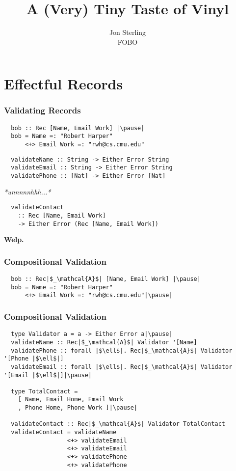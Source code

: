 \documentclass[tikz, 12pt]{beamer}
\title{A (Very) Tiny Taste of Vinyl}
\author{Jon Sterling\\
    FOBO
}
\begin{document}
\begin{frame}
  \titlepage
\end{frame}

\section{Effectful Records}

\begin{frame}[fragile]
  \frametitle{Validating Records}\pause
  \begin{lstlisting}
  bob :: Rec [Name, Email Work] |\pause|
  bob = Name =: "Robert Harper"
      <+> Email Work =: "rwh@cs.cmu.edu"
  \end{lstlisting}
  \pause
  \begin{lstlisting}
  validateName :: String -> Either Error String
  validateEmail :: String -> Either Error String
  validatePhone :: [Nat] -> Either Error [Nat]
  \end{lstlisting}
  \pause
  \centerline{\textit{*unnnnnhhh...*}}
  \pause
  \begin{lstlisting}
  validateContact
    :: Rec [Name, Email Work]
    -> Either Error (Rec [Name, Email Work])
  \end{lstlisting}
\end{frame}
\begin{frame}
  \centerline{\textbf{Welp.}}
\end{frame}

\begin{frame}[fragile]
  \frametitle{Compositional Validation}

  \begin{lstlisting}
  bob :: Rec|$_\mathcal{A}$| [Name, Email Work] |\pause|
  bob = Name =: "Robert Harper"
      <+> Email Work =: "rwh@cs.cmu.edu"|\pause|
  \end{lstlisting}
\end{frame}

\begin{frame}[fragile]
  \frametitle{Compositional Validation}
  \begin{lstlisting}
  type Validator a = a -> Either Error a|\pause|
  validateName :: Rec|$_\mathcal{A}$| Validator '[Name]
  validatePhone :: forall |$\ell$|. Rec|$_\mathcal{A}$| Validator '[Phone |$\ell$|]
  validateEmail :: forall |$\ell$|. Rec|$_\mathcal{A}$| Validator '[Email |$\ell$|]|\pause|

  type TotalContact =
    [ Name, Email Home, Email Work
    , Phone Home, Phone Work ]|\pause|

  validateContact :: Rec|$_\mathcal{A}$| Validator TotalContact
  validateContact = validateName
                  <+> validateEmail
                  <+> validateEmail
                  <+> validatePhone
                  <+> validatePhone
  \end{lstlisting}
\end{frame}
\end{document}

